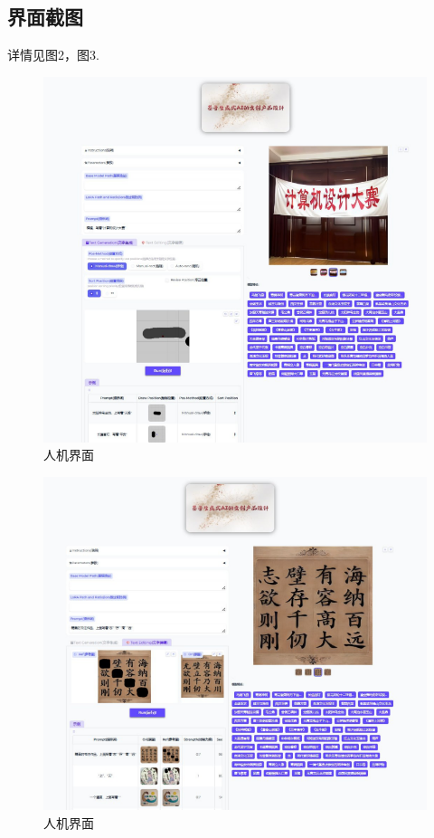 \documentclass[a4paper,12pt]{article}
\begin{document}
\subsection{界面截图}
详情见图2，图3.
\begin{figure}[htbp] %
    \centering %
    \includegraphics[width=1\textwidth]{Image/UI_1.png} %
    \caption{人机界面} %
    \label{fig:logo} %
\end{figure}
\begin{figure}[htbp] %
    \centering %
    \includegraphics[width=1\textwidth]{Image/UI_2.png} %
    \caption{人机界面} %
    \label{fig:logo} %
\end{figure}
\end{document}

